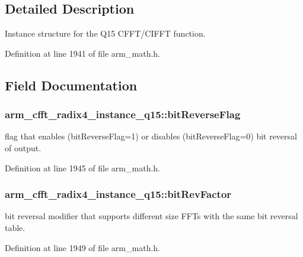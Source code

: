 \subsection{Detailed Description}
Instance structure for the Q15 C\-F\-F\-T/\-C\-I\-F\-F\-T function. 

Definition at line 1941 of file arm\-\_\-math.\-h.



\subsection{Field Documentation}
\hypertarget{structarm__cfft__radix4__instance__q15_a101e3f7b0bd6b5b14cd5214f23df4133}{
\subsubsection[{bit\-Reverse\-Flag}]{ arm\-\_\-cfft\-\_\-radix4\-\_\-instance\-\_\-q15\-::bit\-Reverse\-Flag}}\label{structarm__cfft__radix4__instance__q15_a101e3f7b0bd6b5b14cd5214f23df4133}
flag that enables (bit\-Reverse\-Flag=1) or disables (bit\-Reverse\-Flag=0) bit reversal of output. 

Definition at line 1945 of file arm\-\_\-math.\-h.

\hypertarget{structarm__cfft__radix4__instance__q15_a6b010e5f02d1130c621e3d2e26b95df1}{
\subsubsection[{bit\-Rev\-Factor}]{ arm\-\_\-cfft\-\_\-radix4\-\_\-instance\-\_\-q15\-::bit\-Rev\-Factor}}\label{structarm__cfft__radix4__instance__q15_a6b010e5f02d1130c621e3d2e26b95df1}
bit reversal modifier that supports different size F\-F\-Ts with the same bit reversal table. 

Definition at line 1949 of file arm\-\_\-math.\-h.

